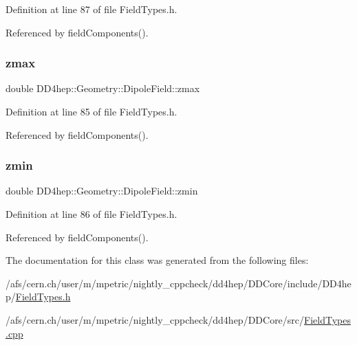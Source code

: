 Definition at line 87 of file Field\+Types.\+h.



Referenced by field\+Components().

\hypertarget{class_d_d4hep_1_1_geometry_1_1_dipole_field_acc7b4e9b6fac44800ef4f37f65adaefd}{}\label{class_d_d4hep_1_1_geometry_1_1_dipole_field_acc7b4e9b6fac44800ef4f37f65adaefd} 
\subsubsection{\texorpdfstring{zmax}{zmax}}
{\footnotesize\ttfamily double D\+D4hep\+::\+Geometry\+::\+Dipole\+Field\+::zmax}



Definition at line 85 of file Field\+Types.\+h.



Referenced by field\+Components().

\hypertarget{class_d_d4hep_1_1_geometry_1_1_dipole_field_a871a5339aaac0458cf912b44317d5eed}{}\label{class_d_d4hep_1_1_geometry_1_1_dipole_field_a871a5339aaac0458cf912b44317d5eed} 
\subsubsection{\texorpdfstring{zmin}{zmin}}
{\footnotesize\ttfamily double D\+D4hep\+::\+Geometry\+::\+Dipole\+Field\+::zmin}



Definition at line 86 of file Field\+Types.\+h.



Referenced by field\+Components().



The documentation for this class was generated from the following files\+:\begin{DoxyCompactItemize}
\item 
/afs/cern.\+ch/user/m/mpetric/nightly\+\_\+cppcheck/dd4hep/\+D\+D\+Core/include/\+D\+D4hep/\hyperlink{_field_types_8h}{Field\+Types.\+h}\item 
/afs/cern.\+ch/user/m/mpetric/nightly\+\_\+cppcheck/dd4hep/\+D\+D\+Core/src/\hyperlink{_field_types_8cpp}{Field\+Types.\+cpp}\end{DoxyCompactItemize}
